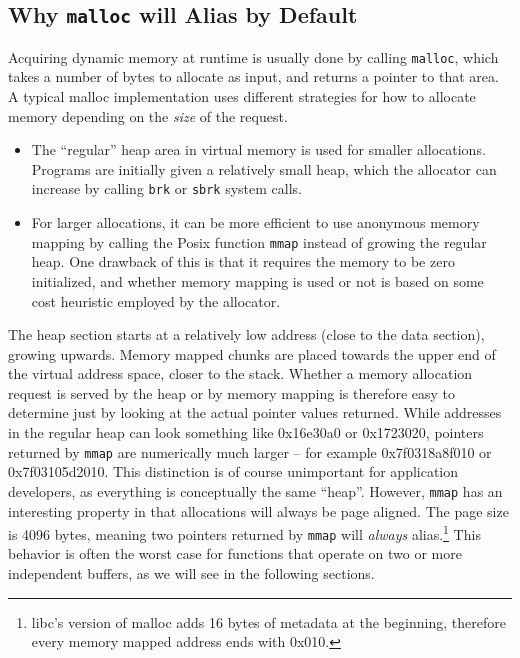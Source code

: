 \documentclass[prodmode,acmtaco]{acmsmall}
\begin{document}
{\subsection{Why \texttt{malloc} will Alias by Default}
Acquiring dynamic memory at runtime is usually done by calling \texttt{malloc}, which takes a number of bytes to allocate as input, and returns a pointer to that area.
A typical malloc implementation uses different strategies for how to allocate memory depending on the \emph{size} of the request.
\begin{itemize}
  \item The ``regular'' heap area in virtual memory is used for smaller allocations. 
  Programs are initially given a relatively small heap, which the allocator can increase by calling \texttt{brk} or \texttt{sbrk} system calls.
  \item For larger allocations, it can be more efficient to use anonymous memory mapping by calling the Posix function \texttt{mmap} instead of growing the regular heap.
  One drawback of this is that it requires the memory to be zero initialized, and whether memory mapping is used or not is based on some cost heuristic employed by the allocator.
\end{itemize}
The heap section starts at a relatively low address (close to the data section), growing upwards.
Memory mapped chunks are placed towards the upper end of the virtual address space, closer to the stack.
Whether a memory allocation request is served by the heap or by memory mapping is therefore easy to determine just by looking at the actual pointer values returned.
While addresses in the regular heap can look something like 0x16e30a0 or 0x1723020, pointers returned by \texttt{mmap} are numerically much larger -- for example 0x7f0318a8f010 or 0x7f03105d2010.
This distinction is of course unimportant for application developers, as everything is conceptually the same ``heap''.
However, \texttt{mmap} has an interesting property in that allocations will always be page aligned.
The page size is 4096 bytes, meaning two pointers returned by \texttt{mmap} will \emph{always} alias.\footnote{libc's version of malloc adds 16 bytes of metadata at the beginning, therefore every memory mapped address ends with 0x010.}
This behavior is often the worst case for functions that operate on two or more independent buffers, as we will see in the following sections.


}
\end{document}

